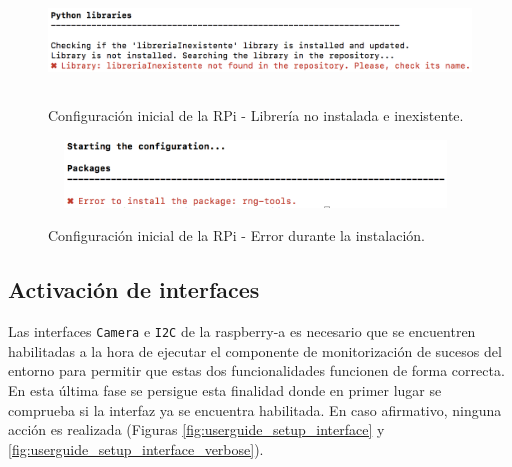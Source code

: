\documentclass[12pt,a4paper, twoside]{report}
\begin{document}
\begin{itemize}
		\begin{figure}[!ht]   
			\caption{Configuración inicial de la RPi - Librería no instalada e inexistente.} 
			\begin{center} 
				\includegraphics[width=14cm,height=2.5cm]{Images/userGuide/setup/library_noexiste} \\
				\label{fig:userguide_setup_library_noexiste} 
			\end{center}  
		\end{figure}
		
		\begin{figure}[!ht]   
			\caption{Configuración inicial de la RPi - Error durante la instalación.} 
			\begin{center} 
				\includegraphics[width=11cm,height=1.8cm]{Images/userGuide/setup/error_install} \\
				\label{fig:userguide_setup_error_install} 
			\end{center}  
		\end{figure}
		
	\end{itemize}
 
	\newpage
	
	\subsection{Activación de interfaces}
	 	
	 Las interfaces \texttt{Camera} e \texttt{I2C} de la \gls{raspberry-a} es necesario que se encuentren habilitadas a la hora de ejecutar el componente de monitorización de sucesos del entorno para permitir que estas dos funcionalidades funcionen de forma correcta. En esta última fase se persigue esta finalidad donde en primer lugar se comprueba si la interfaz ya se encuentra habilitada. En caso afirmativo, ninguna acción es realizada (Figuras \ref{fig:userguide_setup_interface} y \ref{fig:userguide_setup_interface_verbose}). \\
	 	
\end{document}
